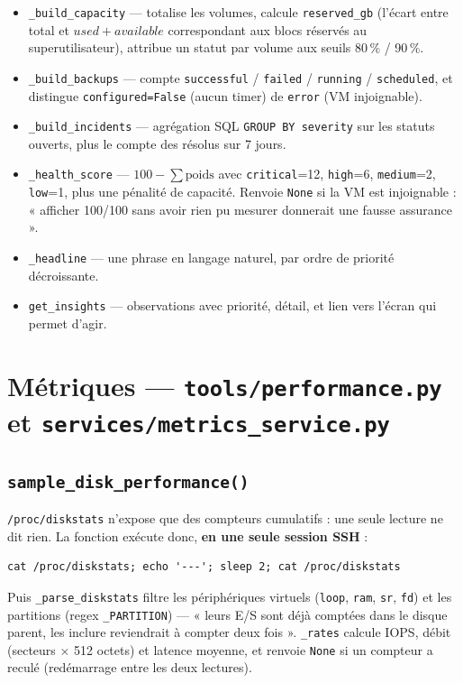 \documentclass[11pt,a4paper]{report}
\newcommand{\file}[1]{\texttt{\small #1}}
\newcommand{\fn}[1]{\texttt{\small\textcolor{oasisviolet}{#1}}}
\begin{document}
\begin{itemize}
  \item \fn{\_build\_capacity} --- totalise les volumes, calcule
  \texttt{reserved\_gb} (l'écart entre total et \(used + available\)
  correspondant aux blocs réservés au superutilisateur), attribue un statut par
  volume aux seuils 80\,\% / 90\,\%.
  \item \fn{\_build\_backups} --- compte
  \texttt{successful} / \texttt{failed} / \texttt{running} / \texttt{scheduled},
  et distingue \texttt{configured=False} (aucun timer) de \texttt{error} (VM
  injoignable).
  \item \fn{\_build\_incidents} --- agrégation SQL \texttt{GROUP BY severity} sur
  les statuts ouverts, plus le compte des résolus sur 7 jours.
  \item \fn{\_health\_score} --- \(100 - \sum \text{poids}\) avec
  \texttt{critical}=12, \texttt{high}=6, \texttt{medium}=2, \texttt{low}=1, plus
  une pénalité de capacité. Renvoie \texttt{None} si la VM est injoignable :
  « afficher 100/100 sans avoir rien pu mesurer donnerait une fausse
  assurance ».
  \item \fn{\_headline} --- une phrase en langage naturel, par ordre de priorité
  décroissante.
  \item \fn{get\_insights} --- observations avec priorité, détail, et lien vers
  l'écran qui permet d'agir.
\end{itemize}

\section{Métriques --- \file{tools/performance.py} et \file{services/metrics\_service.py}}

\subsection*{\fn{sample\_disk\_performance()}}
\texttt{/proc/diskstats} n'expose que des compteurs cumulatifs : une seule
lecture ne dit rien. La fonction exécute donc, \textbf{en une seule session
SSH} :

\begin{lstlisting}[caption={La commande réellement envoyée à la VM}]
cat /proc/diskstats; echo '---'; sleep 2; cat /proc/diskstats
\end{lstlisting}

\noindent
Puis \fn{\_parse\_diskstats} filtre les périphériques virtuels
(\texttt{loop}, \texttt{ram}, \texttt{sr}, \texttt{fd}) et les partitions
(regex \fn{\_PARTITION}) --- « leurs E/S sont déjà comptées dans le disque
parent, les inclure reviendrait à compter deux fois ».
\fn{\_rates} calcule IOPS, débit (secteurs \(\times\) 512 octets) et latence
moyenne, et renvoie \texttt{None} si un compteur a reculé (redémarrage entre les
deux lectures).
\end{document}
